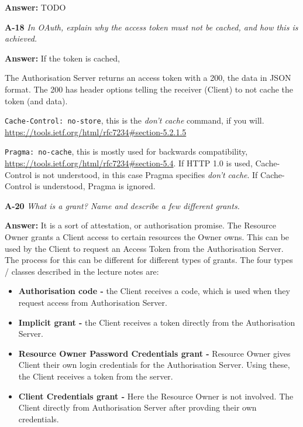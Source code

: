 \documentclass[a4paper]{article}
\newcommand{\Q}[2]{ \vspace{10pt} \textbf{A-#1} \textit{#2} }
\newcommand{\A}[1]{ \textbf{Answer:} #1 }
\begin{document}
\A{
    TODO
}

\Q{18} { %
    In OAuth, explain why the access token must not be cached, and how this is 
    achieved.
}

\A{
    If the token is cached, 

    The Authorisation Server returns an access token with a 200,
    the data in JSON format. The 200 has header options
    telling the receiver (Client) to not cache the token (and data).

    \texttt{Cache-Control: no-store}, this is the \textit{don't cache}
    command, if you will. 
    \url{https://tools.ietf.org/html/rfc7234#section-5.2.1.5}

    \texttt{Pragma: no-cache}, this is mostly used for backwards 
    compatibility, \url{https://tools.ietf.org/html/rfc7234#section-5.4}.
    If HTTP 1.0 is used, Cache-Control is not understood,
    in this case Pragma specifies \textit{don't cache}. 
    If Cache-Control is understood, Pragma is ignored.

}

\Q{20} { %
    What is a grant? Name and describe a few different grants.
}

\A{
    It is a sort of attestation, or authorisation promise. 
    The Resource Owner grants a Client access to certain resources
    the Owner owns. This can be used by the Client to request
    an Access Token from the Authorisation Server.
    The process for this can be different for different types
    of grants. The four types / classes described in the lecture notes are:

    \begin{itemize}
        \item \textbf{Authorisation code - }
            the Client receives a code, which is used
            when they request access from Authorisation Server.
        \item \textbf{Implicit grant - }
            the Client receives a token directly from the Authorisation
            Server.
        \item \textbf{Resource Owner Password Credentials grant - }
            Resource Owner gives Client their own login credentials
            for the Authorisation Server. Using these, the Client 
            receives a token from the server.
        \item \textbf{Client Credentials grant - }
            Here the Resource Owner is not involved. The Client
            directly from Authorisation Server after provding
            their own credentials.
    \end{itemize}

}
\end{document}
